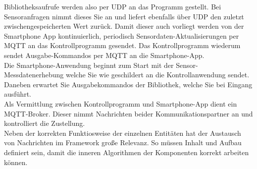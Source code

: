 \documentclass[11pt,a4paper]{report}
\begin{document}
Bibliotheksaufrufe werden also per UDP an das Programm gestellt.
Bei Sensoranfragen nimmt dieses Sie an und liefert ebenfalls über UDP den zuletzt zwischengespeicherten Wert zurück.
Damit dieser auch vorliegt werden von der Smartphone App kontinuierlich, periodisch Sensordaten-Aktualisierungen per MQTT an das Kontrollprogramm gesendet.
Das Kontrollprogramm wiederum sendet Ausgabe-Kommandos per MQTT an die Smartphone-App.
\\
Die Smartphone-Anwendung beginnt zum Start mit der Sensor-Messdatenerhebung welche Sie wie geschildert an die Kontrollanwendung sendet.
Daneben erwartet Sie Ausgabekommandos der Bibliothek, welche Sie bei Eingang ausführt.
\\
Als Vermittlung zwischen Kontrollprogramm und Smartphone-App dient ein MQTT-Broker.
Dieser nimmt Nachrichten beider Kommunikationspartner an und kontrolliert die Zustellung.
\\
Neben der korrekten Funktiosweise der einzelnen Entitäten hat der Austausch von Nachrichten im Framework große Relevanz.
So müssen Inhalt und Aufbau definiert sein, damit die inneren Algorithmen der Komponenten korrekt arbeiten können.
\end{document}
